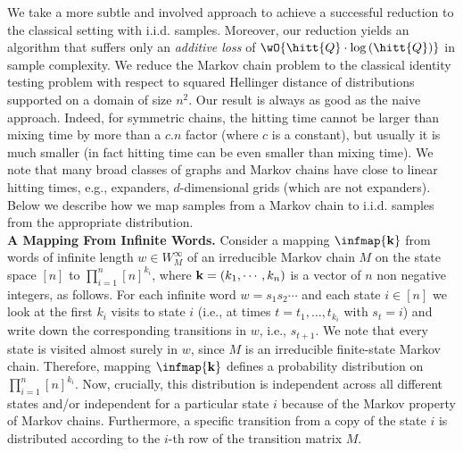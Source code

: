 \noindent We take a more subtle and involved approach to achieve a successful reduction to the classical setting with i.i.d. samples. Moreover, our reduction yields an algorithm that suffers only an {\em additive loss} of $\wO{\hitt{Q}\cdot\log\left(\hitt{Q}\right)}$ in sample complexity. We reduce the Markov chain problem to the classical identity testing problem with respect to squared Hellinger distance of distributions supported on a domain of size $n^2$. Our result is always as good as the naive approach. Indeed, for symmetric chains, the hitting time cannot be larger than mixing time by more than a $c.n$ factor (where $c$ is a constant), but usually it is much smaller (in fact hitting time can be even smaller than mixing time).  
We note that many broad classes of graphs and Markov chains have close to linear hitting times, e.g., expanders, $d$-dimensional grids (which are not expanders). Below we describe how we map samples from a Markov chain to i.i.d. samples from the appropriate distribution.\\

\noindent \textbf{A Mapping From Infinite Words.} Consider a mapping $\infmap{\vect{k}}$ from words of infinite length $w \in W_M^{\infty}$ of an irreducible Markov chain $M$ on the state space $[n]$ to $\prod_{i=1}^{n}
[n]^{k_i}$, where $\mathbf{k}=(k_1,\cdots,k_n)$ is a vector of $n$ non negative integers, as follows. For each infinite word $w=s_1s_2\cdots$ and each state 
$i\in[n]$ we look at the first $k_i$ visits to state $i$ (i.e., at times $t=t_1,\dots,t_{k_i}$ with $s_{t}=i$) and write down the corresponding 
transitions in $w$, i.e., $s_{t+1}$. We note that every state is visited almost surely in $w$, since $M$ is an irreducible finite-state Markov chain. 
Therefore, mapping $\infmap{\vect{k}}$ defines a probability distribution on $\prod_{i=1}^{n}[n]^{k_i}$. Now, crucially, this distribution is independent across all different states and/or independent for a particular state $i$ because of the Markov property of Markov chains. Furthermore, a specific transition from a copy of the state $i$ is distributed according to the $i$-th row of the transition matrix $M$.

